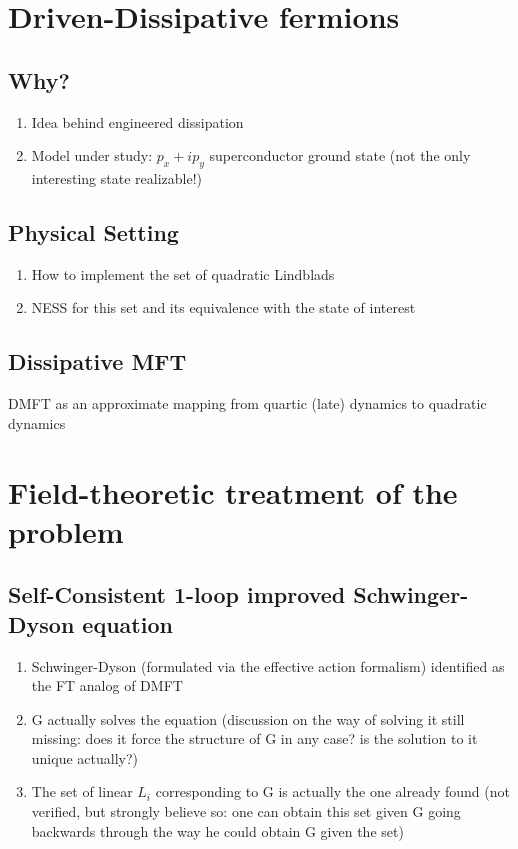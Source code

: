 \documentclass[a4paper,10pt]{article}
\theoremstyle{remark}
\newcommand{\nsec}{\vskip 0.8cm}
\begin{document}
  \section{Driven-Dissipative fermions}
   \subsection{Why?}
    \begin{enumerate}
     \item Idea behind engineered dissipation
     \item Model under study: $p_x+ip_y$ superconductor ground state (not the only interesting state realizable!)
    \end{enumerate}
   \subsection{Physical Setting}
    \begin{enumerate}
     \item How to implement the set of quadratic Lindblads
     \item NESS for this set and its equivalence with the state of interest
    \end{enumerate}
   \subsection{Dissipative MFT}
    DMFT as an approximate mapping from quartic (late) dynamics to quadratic dynamics
  \nsec 
  
  \section{Field-theoretic treatment of the problem} 
   \subsection{Self-Consistent 1-loop improved Schwinger-Dyson equation}
    \begin{enumerate}
     \item Schwinger-Dyson (formulated via the effective action formalism) identified as the FT analog of DMFT
     \item G actually solves the equation (discussion on the way of solving it still missing: does it force the structure of G in any case? is the solution to it unique actually?)
     \item The set of linear $L_i$ corresponding to G is actually the one already found (not verified, but strongly believe so: one can obtain this set given G going backwards through the way he could obtain G given the set)
    \end{enumerate} 
\end{document}
